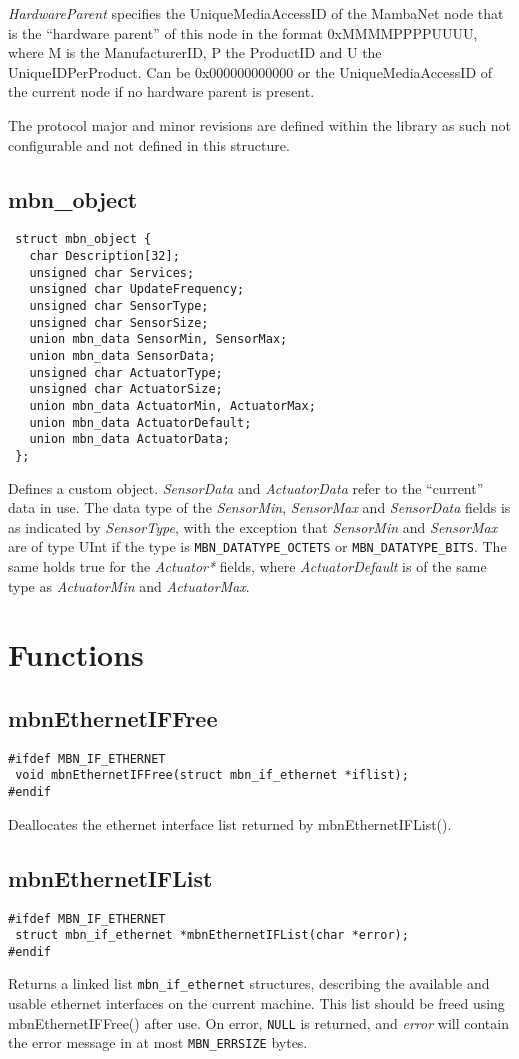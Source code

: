 \documentclass[a4paper]{report}
\begin{document}
\textit{HardwareParent} specifies the UniqueMediaAccessID of the MambaNet node that is the ``hardware parent'' of this node in the format 0xMMMMPPPPUUUU, where M is the ManufacturerID, P the ProductID and U the UniqueIDPerProduct. Can be 0x000000000000 or the UniqueMediaAccessID of the current node if no hardware parent is present.

The protocol major and minor revisions are defined within the library as such not configurable and not defined in this structure.


\subsection{mbn\_object}
\begin{verbatim}
 struct mbn_object {
   char Description[32];
   unsigned char Services;
   unsigned char UpdateFrequency;
   unsigned char SensorType;
   unsigned char SensorSize;
   union mbn_data SensorMin, SensorMax;
   union mbn_data SensorData;
   unsigned char ActuatorType;
   unsigned char ActuatorSize;
   union mbn_data ActuatorMin, ActuatorMax;
   union mbn_data ActuatorDefault;
   union mbn_data ActuatorData;
 };
\end{verbatim}
Defines a custom object. \textit{SensorData} and \textit{ActuatorData} refer to the ``current'' data in use. The data type of the \textit{SensorMin}, \textit{SensorMax} and \textit{SensorData} fields is as indicated by \textit{SensorType}, with the exception that \textit{SensorMin} and \textit{SensorMax} are of type UInt if the type is \verb|MBN_DATATYPE_OCTETS| or \verb|MBN_DATATYPE_BITS|. The same holds true for the \textit{Actuator*} fields, where \textit{ActuatorDefault} is of the same type as \textit{ActuatorMin} and \textit{ActuatorMax}.




\cleardoublepage
\section{Functions}
\subsection{mbnEthernetIFFree}
\begin{verbatim}
#ifdef MBN_IF_ETHERNET
 void mbnEthernetIFFree(struct mbn_if_ethernet *iflist);
#endif
\end{verbatim}
Deallocates the ethernet interface list returned by mbnEthernetIFList().


\subsection{mbnEthernetIFList}
\begin{verbatim}
#ifdef MBN_IF_ETHERNET
 struct mbn_if_ethernet *mbnEthernetIFList(char *error);
#endif
\end{verbatim}
Returns a linked list \verb|mbn_if_ethernet| structures, describing the available and usable ethernet interfaces on the current machine. This list should be freed using mbnEthernetIFFree() after use. On error, \verb|NULL| is returned, and \textit{error} will contain the error message in at most \verb|MBN_ERRSIZE| bytes.
\end{document}
